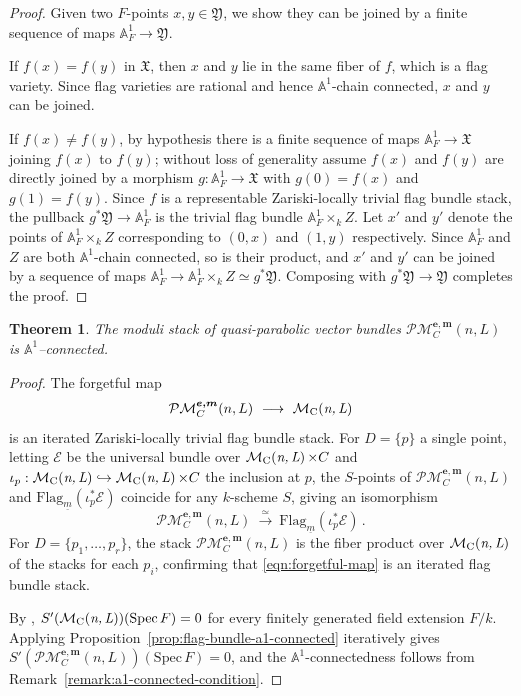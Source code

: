 \documentclass[12pt,reqno]{amsart}
\DeclareMathOperator{\mnl}{\mc{M}_C(\textit{n,\,L})}
\newcommand{\mf}[1]{\mathfrak{#1}}
\newcommand{\mc}[1]{\mathcal{#1}}
\newcommand{\bb}[1]{\mathbb{#1}}
\newtheorem{theorem}{Theorem}[section]
\theoremstyle{definition}
\numberwithin{equation}{section}
\begin{document}
	\begin{proof}
		Given two $F$-points $x, y \in \mf{Y}$, we show they can be joined by a
		finite sequence of maps $\bb{A}^1_F\longrightarrow\mf{Y}$.
		
		If $f(x)=f(y)$ in $\mf{X}$, then $x$ and $y$ lie in the same fiber of $f$,
		which is a flag variety. Since flag varieties are rational and hence
		$\bb{A}^1$-chain connected, $x$ and $y$ can be joined.
		
		If $f(x)\neq f(y)$, by hypothesis there is a finite sequence of maps
		$\bb{A}^1_F\to\mf{X}$ joining $f(x)$ to $f(y)$; without loss of generality
		assume $f(x)$ and $f(y)$ are directly joined by a morphism
		$g: \bb{A}^1_F\longrightarrow \mf{X}$ with $g(0)=f(x)$ and $g(1)=f(y)$.
		Since $f$ is a representable Zariski-locally trivial flag bundle stack, the
		pullback $g^*\mf{Y}\longrightarrow \bb{A}^1_F$ is the trivial flag bundle
		$\bb{A}^1_F\times_k Z$. Let $x'$ and $y'$ denote the points of
		$\bb{A}^1_F\times_k Z$ corresponding to $(0,x)$ and $(1,y)$ respectively.
		Since $\bb{A}^1_F$ and $Z$ are both $\bb{A}^1$-chain connected, so is their
		product, and $x'$ and $y'$ can be joined by a sequence of maps
		$\bb{A}^1_F\to \bb{A}^1_F\times_k Z \simeq g^*\mf{Y}$. Composing with
		$g^*\mf{Y}\to\mf{Y}$ completes the proof.
	\end{proof}
	\medskip
	
	\begin{theorem}\label{thm:quasi-parabolic-moduli-a1-connected}
		The moduli stack of quasi-parabolic vector bundles $\mc{PM}_C^{\boldsymbol{e,m}}(n,L)$
		is $\bb{A}^1$--connected.
	\end{theorem}
	
	\begin{proof}
		The forgetful map
		\begin{align}\label{eqn:forgetful-map}
			\mc{PM}_C^{\boldsymbol{e,m}}(n,L) \ \longrightarrow\ \mnl
		\end{align}
		is an iterated Zariski-locally trivial flag bundle stack. For $D=\{p\}$ a
		single point, letting $\mc{E}$ be the universal bundle over $\mnl\times C$
		and $\iota_p:\mnl\hookrightarrow\mnl\times C$ the inclusion at $p$, the
		$S$-points of $\mc{PM}_C^{\boldsymbol{e,m}}(n,L)$ and
		$\mathrm{Flag}_{\underline{m}}(\iota_p^*\mc{E})$ coincide for any $k$-scheme
		$S$, giving an isomorphism
		\[
		\mc{PM}_C^{\boldsymbol{e,m}}(n,L)\ \overset{\simeq}{\longrightarrow}\
		\mathrm{Flag}_{\underline{m}}(\iota_p^*\mc{E})\,.
		\]
		For $D=\{p_1,\ldots,p_r\}$, the stack $\mc{PM}_C^{\boldsymbol{e,m}}(n,L)$
		is the fiber product over $\mnl$ of the stacks for each $p_i$, confirming
		that \eqref{eqn:forgetful-map} is an iterated flag bundle stack.
		
		By \cite[Theorem~1.1]{HY24}, $S'(\mnl)(\mathrm{Spec}\,F)=0$ for every
		finitely generated field extension $F/k$. Applying
		Proposition~\ref{prop:flag-bundle-a1-connected} iteratively gives
		$S'(\mc{PM}_C^{\boldsymbol{e,m}}(n,L))(\mathrm{Spec}\,F)=0$, and the
		$\bb{A}^1$-connectedness follows from Remark~\ref{remark:a1-connected-condition}.
	\end{proof}
	
\end{document}
